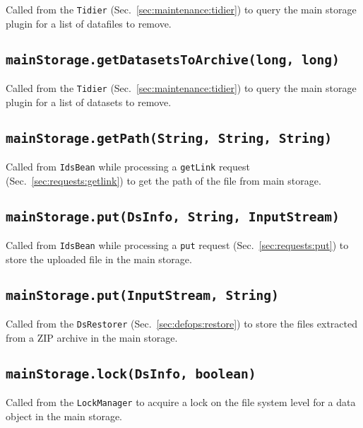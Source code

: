 \documentclass[paper=a4]{scrartcl}
\begin{document}
Called from the \texttt{Tidier} (Sec.~\ref{sec:maintenance:tidier}) to
query the main storage plugin for a list of datafiles to remove.

\subsection{\texttt{mainStorage.getDatasetsToArchive(long, long)}}

Called from the \texttt{Tidier} (Sec.~\ref{sec:maintenance:tidier}) to
query the main storage plugin for a list of datasets to remove.

\subsection{\texttt{mainStorage.getPath(String, String, String)}}

Called from \texttt{IdsBean} while processing a \texttt{getLink}
request (Sec.~\ref{sec:requests:getlink}) to get the path of the file
from main storage.

\subsection{\texttt{mainStorage.put(DsInfo, String, InputStream)}}

Called from \texttt{IdsBean} while processing a \texttt{put} request
(Sec.~\ref{sec:requests:put}) to store the uploaded file in the main
storage.

\subsection{\texttt{mainStorage.put(InputStream, String)}}

Called from the \texttt{DsRestorer} (Sec.~\ref{sec:defops:restore})
to store the files extracted from a ZIP archive in the main storage.

\subsection{\texttt{mainStorage.lock(DsInfo, boolean)}}

Called from the \texttt{LockManager} to acquire a lock on the file
system level for a data object in the main storage.
\end{document}
